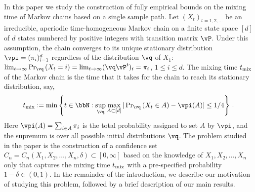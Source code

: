 

In this paper we study the construction of fully empirical bounds on the mixing time of Markov chains based on a single sample path.
Let $(X_t)_{t=1,2,\dotsc}$ be an irreducible, aperiodic time-homogeneous Markov chain on a finite state space $[d]$ of $d$ states numbered by positive integers with transition matrix $\vP$. Under this assumption, the chain converges to its unique stationary 
distribution $\vpi = (\pi_i)_{i=1}^d$ regardless of the distribution $\vq$ of $X_1$: 
$\lim_{t\to\infty} \Pr_{\vq}\Parens{X_t = i} = \lim_{t\to\infty} (\vq \vP^t)_i = \pi_i$, $1\le i \le d$.
The mixing time $t_{\operatorname{mix}}$ of the Markov chain is the time that it takes for the chain to reach its stationary distribution, say,
\[
  \tmix
  :=
  \min\Braces{
    t \in \bbN :
    \sup_{\vq}
    \max_{A\subset [d]} |\textstyle\Pr_{\vq}\Parens{ X_t \in A } - \vpi(A)|
    \leq 1/4
  }\,.
\]
Here $\vpi(A) = \sum_{i\in A} \pi_i$ is the total probability assigned
to set $A$ by $\vpi$, and the supremum is over
all possible initial distributions $\vq$.
The problem studied in the paper is the construction of a confidence
set $C_n = C_n(X_1,X_2,\dotsc,X_n,\delta) \subset [0,\infty]$ based on
the knowledge of $X_1,X_2,\dotsc,X_n$ only that captures the mixing
time $t_{\operatorname{mix}}$ with a pre-specified probability $1-\delta \in (0,1)$. 
In the remainder of the introduction, we describe our motivation of studying this problem, followed by a 
brief description of our main results.
 

